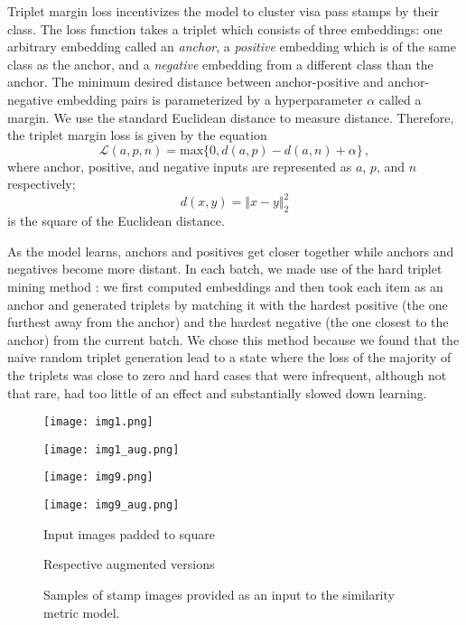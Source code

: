 \documentclass[twocolumn]{svjour3}
\begin{document}
Triplet margin loss incentivizes the model to cluster visa pass stamps by their class. The loss function takes a triplet which consists of three embeddings: one arbitrary embedding called an \textit{anchor}, a \textit{positive} embedding which is of the same class as the anchor, and a \textit{negative} embedding from a different class than the anchor. The minimum desired distance between anchor-positive and anchor-negative embedding pairs is parameterized by a hyperparameter $\alpha$ called a margin. We use the standard Euclidean distance to measure distance. Therefore, the triplet margin loss is given by the equation
\begin{equation}
   \mathcal{L}(a, p, n) = \mathrm{max}\{0, d(a, p) - d(a, n) + \alpha\}\,,
\end{equation}
where anchor, positive, and negative inputs are represented as $a$, $p$, and $n$ respectively;
\begin{equation}
  d(x, y) = \Vert x - y \Vert_2^2
\end{equation}
is the square of the Euclidean distance.

As the model learns, anchors and positives get closer together while anchors and negatives become more distant. In each batch, we made use of the hard triplet mining method \cite{schroff_facenet_2015}: we first computed embeddings and then took each item as an anchor and generated triplets by matching it with the hardest positive (the one furthest away from the anchor) and the hardest negative (the one closest to the anchor) from the current batch. We chose this method because we found that the naive random triplet generation lead to a state where the loss of the majority of the triplets was close to zero and hard cases that were infrequent, although not that rare, had too little of an effect and substantially slowed down learning.

\begin{figure*}
\centering
\begin{multicols}{2}
    \texttt{[image: img1.png]}\par
    \texttt{[image: img1\_aug.png]}
\end{multicols}
\begin{multicols}{2}
    \texttt{[image: img9.png]}\par
    \texttt{[image: img9\_aug.png]}
\end{multicols}
\begin{multicols}{2}
    Input images padded to square\par
    Respective augmented versions
\end{multicols}
\caption{Samples of stamp images provided as an input to the similarity metric model.}
\label{sample_images}
\end{figure*}
\end{document}
